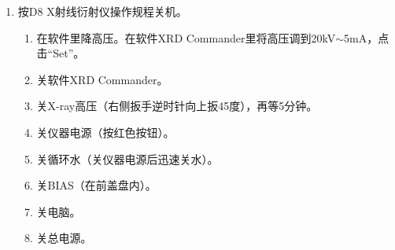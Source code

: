 \documentclass[a4paper]{article}
\begin{document}
\begin{enumerate}
\item 按D8 X射线衍射仪操作规程关机。
\begin{enumerate}
	\item 在软件里降高压。在软件XRD Commander里将高压调到20kV$ \sim $5mA，点击“Set”。
	\item 关软件XRD Commander。
	\item 关X-ray高压（右侧扳手逆时针向上扳45度），再等5分钟。
	\item 关仪器电源（按红色按钮）。
	\item 关循环水（关仪器电源后迅速关水）。
	\item 关BIAS（在前盖盘内）。
	\item 关电脑。
    \item 关总电源。
\end{enumerate}
\end{enumerate}
\end{document}
